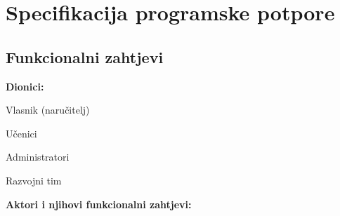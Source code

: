 \chapter{Specifikacija programske potpore}
		
\section{Funkcionalni zahtjevi}

\noindent \textbf{Dionici:}
			
\begin{packed_enum}
	
	\item Vlasnik (naručitelj)
	\item Učenici				
	\item Administratori
	\item Razvojni tim
	
	
\end{packed_enum}

\noindent \textbf{Aktori i njihovi funkcionalni zahtjevi:}
			
